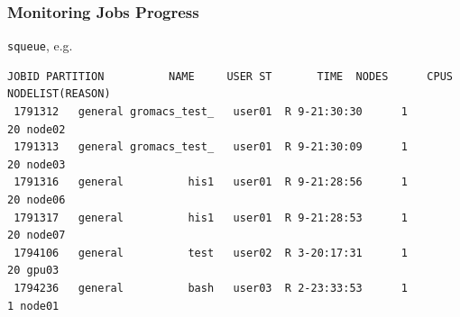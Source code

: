 \documentclass{beamer}
\newcommand{\code}[1]{\colorbox{codegray}{\texttt{#1}}}
\begin{document}
\begin{frame}[fragile]
\frametitle{Monitoring Jobs Progress}
\code{squeue}, e.g. 
\begingroup
\tiny
\begin{lstlisting}[backgroundcolor = \color{codegray},showstringspaces=false]
   JOBID PARTITION          NAME     USER ST       TIME  NODES      CPUS NODELIST(REASON)
 1791312   general gromacs_test_   user01  R 9-21:30:30      1        20 node02
 1791313   general gromacs_test_   user01  R 9-21:30:09      1        20 node03
 1791316   general          his1   user01  R 9-21:28:56      1        20 node06
 1791317   general          his1   user01  R 9-21:28:53      1        20 node07
 1794106   general          test   user02  R 3-20:17:31      1        20 gpu03
 1794236   general          bash   user03  R 2-23:33:53      1         1 node01
\end{lstlisting}
\endgroup
\end{frame}



\end{document}
